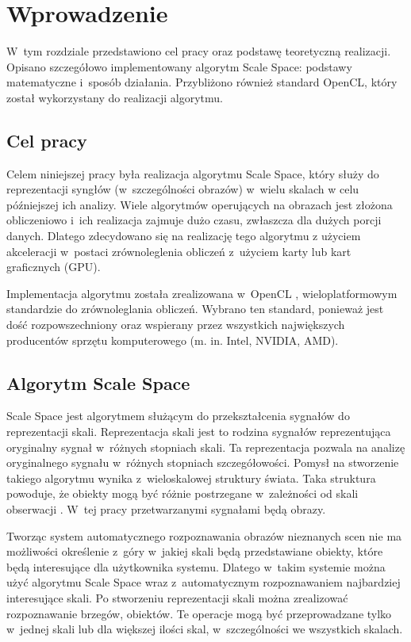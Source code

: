 \chapter{Wprowadzenie}
\label{cha:wprowadzenie}

W~tym rozdziale przedstawiono cel pracy oraz podstawę teoretyczną realizacji. Opisano szczegółowo implementowany algorytm Scale Space: podstawy matematyczne i~sposób działania. Przybliżono również standard OpenCL, który został wykorzystany do realizacji algorytmu.


\section{Cel pracy}
\label{sec:cel}
Celem niniejszej pracy była realizacja algorytmu Scale Space, który służy do reprezentacji syngłów (w~szczególności obrazów) w~wielu skalach w celu późniejszej ich analizy.
Wiele algorytmów operujących na obrazach jest złożona obliczeniowo i~ich realizacja zajmuje dużo czasu, zwłaszcza dla dużych porcji danych. Dlatego zdecydowano się na realizację tego algorytmu z użyciem akceleracji w~postaci zrównoleglenia obliczeń z~użyciem karty lub kart graficznych (GPU).

Implementacja algorytmu została zrealizowana w~OpenCL \cite{OpenCL}, wieloplatformowym standardzie do zrównoleglania obliczeń. Wybrano ten standard, ponieważ jest dość rozpowszechniony oraz wspierany przez wszystkich największych producentów sprzętu komputerowego (m. in. Intel\textsuperscript{\textregistered}, NVIDIA\textsuperscript{\texttrademark}, AMD).

\section{Algorytm Scale Space}
\label{sec:algorytm}
Scale Space jest algorytmem służącym do przekształcenia sygnałów do reprezentacji skali. Reprezentacja skali jest to rodzina sygnałów reprezentująca oryginalny sygnał w~różnych stopniach skali.
Ta reprezentacja pozwala na analizę oryginalnego sygnału w~różnych stopniach szczegółowości.
Pomysł na stworzenie takiego algorytmu wynika z~wieloskalowej struktury świata. Taka struktura powoduje, że obiekty mogą być różnie postrzegane w~zależności od skali obserwacji \cite{Enc09}.
W~tej pracy przetwarzanymi sygnałami będą obrazy.

Tworząc system automatycznego rozpoznawania obrazów nieznanych scen nie ma możliwości określenie z~góry w~jakiej skali będą przedstawiane obiekty, które będą interesujące dla użytkownika systemu. Dlatego w~takim systemie można użyć algorytmu Scale Space wraz z~automatycznym rozpoznawaniem najbardziej interesujące skali. Po stworzeniu reprezentacji skali można zrealizować rozpoznawanie brzegów, obiektów. Te operacje mogą być przeprowadzane tylko w~jednej skali lub dla większej ilości skal, w~szczególności we wszystkich skalach.


